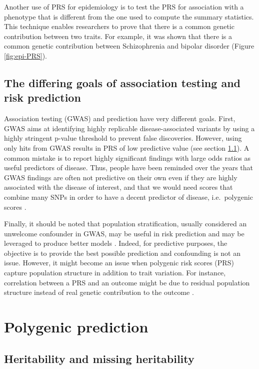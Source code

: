 Another use of PRS for epidemiology is to test the PRS for association with a phenotype that is different from the one used to compute the summary statistics.
This technique enables researchers to prove that there is a common genetic contribution between two traits. 
For example, it was shown that there is a common genetic contribution between Schizophrenia and bipolar disorder (Figure \ref{fig:epi-PRS}). 


\subsection{The differing goals of association testing and risk prediction}

Association testing (GWAS) and prediction have very different goals.
First, GWAS aims at identifying highly replicable disease-associated variants by using a highly stringent p-value threshold to prevent false discoveries. However, using only hits from GWAS results in PRS of low predictive value (see section \ref{sec:missing}). 
A common mistake is to report highly significant findings with large odds ratios as useful predictors of disease. 
Thus, people have been reminded over the years that GWAS findings are often not predictive on their own even if they are highly associated with the disease of interest, and that we would need scores that combine many SNPs in order to have a decent predictor of disease, i.e.\ polygenic scores \cite[]{pepe2004limitations,janssens2006predictive,jakobsdottir2009interpretation,wald2019illusion}.

Finally, it should be noted that population stratification, usually considered an unwelcome confounder in GWAS, may be useful in risk prediction and may be leveraged to produce better models \cite[]{golan2014effective,abraham2015genomic}.
Indeed, for predictive purposes, the objective is to provide the best possible prediction and confounding is not an issue. However, it might become an issue when polygenic risk scores (PRS) capture population structure in addition to trait variation. For instance, correlation between a PRS and an outcome might be due to residual population structure instead of real genetic contribution to the outcome \cite[]{sohail2019polygenic}.


\section{Polygenic prediction}

\subsection{Heritability and missing heritability} \label{sec:missing}

